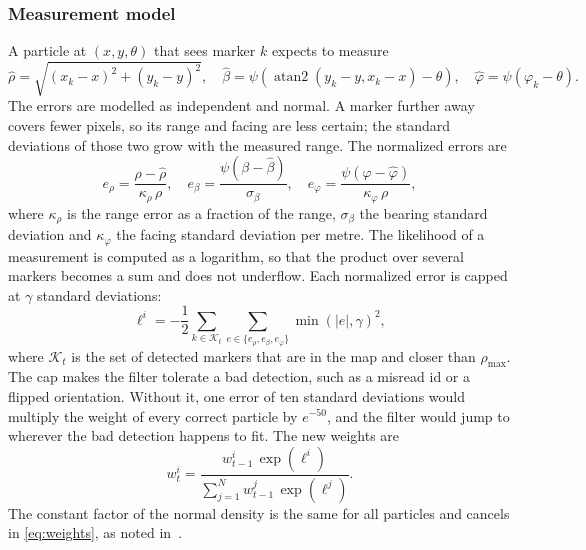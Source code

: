 \documentclass[conference]{IEEEtran}
\begin{document}
\subsubsection{Measurement model}
A particle at $(x, y, \theta)$ that sees marker $k$ expects to measure
\begin{equation}
\hat{\rho} = \sqrt{(x_k - x)^2 + (y_k - y)^2}, \quad
\hat{\beta} = \psi\!\left(\operatorname{atan2}(y_k - y, x_k - x) - \theta\right), \quad
\hat{\varphi} = \psi(\varphi_k - \theta).
\label{eq:expected}
\end{equation}
The errors are modelled as independent and normal. A marker further away covers fewer pixels, so its range and facing are less certain; the standard deviations of those two grow with the measured range. The normalized errors are
\begin{equation}
e_\rho = \frac{\rho - \hat{\rho}}{\kappa_\rho\, \rho}, \quad
e_\beta = \frac{\psi(\beta - \hat{\beta})}{\sigma_\beta}, \quad
e_\varphi = \frac{\psi(\varphi - \hat{\varphi})}{\kappa_\varphi\, \rho},
\label{eq:errors}
\end{equation}
where $\kappa_\rho$ is the range error as a fraction of the range, $\sigma_\beta$ the bearing standard deviation and $\kappa_\varphi$ the facing standard deviation per metre. The likelihood of a measurement is computed as a logarithm, so that the product over several markers becomes a sum and does not underflow. Each normalized error is capped at $\gamma$ standard deviations:
\begin{equation}
\ell^i = -\frac{1}{2} \sum_{k \in \mathcal{K}_t} \sum_{e \in \{e_\rho, e_\beta, e_\varphi\}} \min\!\left(|e|, \gamma\right)^2,
\label{eq:loglik}
\end{equation}
where $\mathcal{K}_t$ is the set of detected markers that are in the map and closer than $\rho_{\max}$. The cap makes the filter tolerate a bad detection, such as a misread id or a flipped orientation. Without it, one error of ten standard deviations would multiply the weight of every correct particle by $e^{-50}$, and the filter would jump to wherever the bad detection happens to fit. The new weights are
\begin{equation}
w_t^i = \frac{w_{t-1}^i\, \exp(\ell^i)}{\sum_{j=1}^{N} w_{t-1}^j\, \exp(\ell^j)}.
\label{eq:weights}
\end{equation}
The constant factor of the normal density is the same for all particles and cancels in \eqref{eq:weights}, as noted in~\cite{clark7b}.
\end{document}
